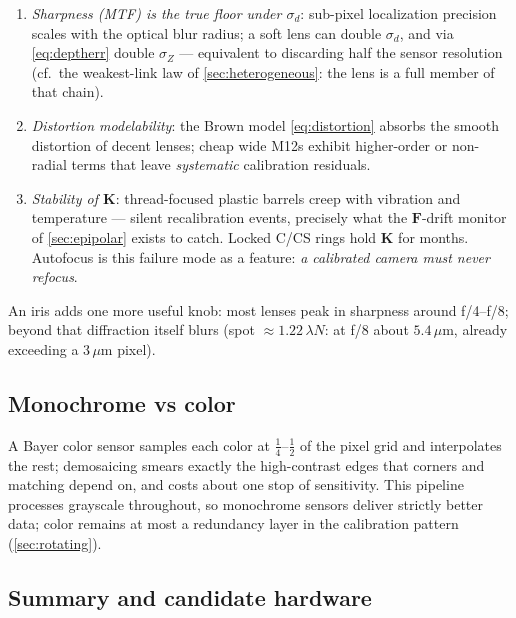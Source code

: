 \documentclass[11pt]{article}
\theoremstyle{definition}
\newcommand{\mat}[1]{\mathbf{#1}}
\newcommand{\K}{\mat{K}}
\newcommand{\F}{\mat{F}}
\begin{document}
\begin{enumerate}
  \item \emph{Sharpness (MTF) is the true floor under $\sigma_d$}:
        sub-pixel localization precision scales with the optical blur
        radius; a soft lens can double $\sigma_d$, and via
        \eqref{eq:deptherr} double $\sigma_Z$ --- equivalent to discarding
        half the sensor resolution (cf.\ the weakest-link law of
        \autoref{sec:heterogeneous}: the lens is a full member of that
        chain).
  \item \emph{Distortion modelability}: the Brown model
        \eqref{eq:distortion} absorbs the smooth distortion of decent
        lenses; cheap wide M12s exhibit higher-order or non-radial terms
        that leave \emph{systematic} calibration residuals.
  \item \emph{Stability of $\K$}: thread-focused plastic barrels creep
        with vibration and temperature --- silent recalibration events,
        precisely what the $\F$-drift monitor of \autoref{sec:epipolar}
        exists to catch. Locked C/CS rings hold $\K$ for months.
        Autofocus is this failure mode as a feature: \emph{a calibrated
        camera must never refocus}.
\end{enumerate}

An iris adds one more useful knob: most lenses peak in sharpness around
f/4--f/8; beyond that diffraction itself blurs (spot
$\approx1.22\,\lambda N$: at f/8 about $5.4\,\mu$m, already exceeding a
$3\,\mu$m pixel).

\subsection{Monochrome vs color}
\label{sec:mono}

A Bayer color sensor samples each color at $\tfrac14$--$\tfrac12$ of the
pixel grid and interpolates the rest; demosaicing smears exactly the
high-contrast edges that corners and matching depend on, and costs about
one stop of sensitivity. This pipeline processes grayscale throughout, so
monochrome sensors deliver strictly better data; color remains at most a
redundancy layer in the calibration pattern (\autoref{sec:rotating}).

\subsection{Summary and candidate hardware}
\label{sec:cameratiers}
\end{document}
